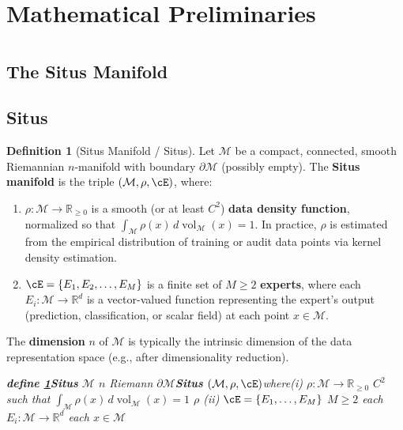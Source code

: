 \documentclass[11pt,a4paper]{article}
\theoremstyle{plain}
\theoremstyle{definition}
\newtheorem{definition}[theorem]{Definition}
\DeclareMathOperator{\vol}{vol}
\newcommand{\R}{\mathbb{R}}
\newcommand{\cM}{\mathcal{M}}
\begin{document}
\section{Mathematical Preliminaries}
\section*{}

\subsection{The Situs Manifold}
\subsection*{Situs}

\begin{definition}[Situs Manifold / Situs]
\label{def:situs}
Let $\cM$ be a compact, connected, smooth Riemannian $n$-manifold with 
boundary $\partial \cM$ (possibly empty). The \textbf{Situs manifold} is 
the triple $(\cM, \rho, \cE)$, where:
\begin{enumerate}[label=(\roman*)]
  \item $\rho: \cM \to \R_{\geq 0}$ is a smooth (or at least $C^2$) 
        \textbf{data density function}, normalized so that 
        $\int_{\cM} \rho(x) \, d\vol_{\cM}(x) = 1$. 
        In practice, $\rho$ is estimated from the empirical distribution 
        of training or audit data points via kernel density estimation.
  
  \item $\cE = \{E_1, E_2, \ldots, E_M\}$ is a finite set of $M \geq 2$ 
        \textbf{experts}, where each $E_i: \cM \to \R^d$ is a vector-valued 
        function representing the expert's output (prediction, classification, 
        or scalar field) at each point $x \in \cM$.
\end{enumerate}
The \textbf{dimension} $n$ of $\cM$ is typically the intrinsic dimension of 
the data representation space (e.g., after dimensionality reduction).
\end{definition}

\bigskip
\noindent
\textit{\textbf{define \ref{def:situs}Situs} $\cM$  $n$  Riemann  $\partial \cM$\textbf{Situs} $(\cM, \rho, \cE)$where(i) $\rho: \cM \to \R_{\geq 0}$  $C^2$\textbf{}such that $\int_{\cM} \rho(x) \, d\vol_{\cM}(x) = 1$ $\rho$ (ii) $\cE = \{E_1, \ldots, E_M\}$  $M \geq 2$ \textbf{}each $E_i: \cM \to \R^d$ each $x \in \cM$ }
\end{document}
